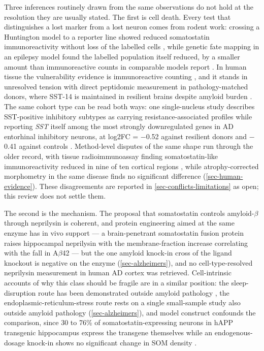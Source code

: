 \documentclass[11pt]{article}
\begin{document}
Three inferences routinely drawn from the same observations do not hold at the resolution they are usually stated. The first is cell death. Every test that distinguishes a lost marker from a lost neuron comes from rodent work: crossing a Huntington model to a reporter line showed reduced somatostatin immunoreactivity without loss of the labelled cells \citep{Voelkl2022}, while genetic fate mapping in an epilepsy model found the labelled population itself reduced, by a smaller amount than immunoreactive counts in comparable models report \citep{Drake2024}. In human tissue the vulnerability evidence is immunoreactive counting \citep{SaizSanchez2014,SanchezMejias2019}, and it stands in unresolved tension with direct peptidomic measurement in pathology-matched donors, where SST-14 is maintained in resilient brains despite amyloid burden \citep{Morgan2024a}. The same cohort type can be read both ways: one single-nucleus study describes SST-positive inhibitory subtypes as carrying resistance-associated profiles while reporting \emph{SST} itself among the most strongly downregulated genes in AD entorhinal inhibitory neurons, at log2FC = $-$0.52 against resilient donors and $-$0.41 against controls \citep{Castanho2025b}. Method-level disputes of the same shape run through the older record, with tissue radioimmunoassay finding somatostatin-like immunoreactivity reduced in nine of ten cortical regions \citep{Gabriel1993}, while atrophy-corrected morphometry in the same disease finds no significant difference (\ref{sec-human-evidence}). These disagreements are reported in \ref{sec-conflicts-limitations} as open; this review does not settle them.

The second is the mechanism. The proposal that somatostatin controls amyloid-$\beta$ through neprilysin \citep{Saito2005} is coherent, and protein engineering aimed at the same enzyme has in vivo support --- a brain-penetrant somatostatin fusion protein raises hippocampal neprilysin with the membrane-fraction increase correlating with the fall in A$\beta$42 \citep{Rofo2021} --- but the one amyloid knock-in cross of the ligand knockout is negative on the enzyme (\ref{sec-alzheimers}), and no cell-type-resolved neprilysin measurement in human AD cortex was retrieved. Cell-intrinsic accounts of why this class should be fragile are in a similar position: the sleep-disruption route has been demonstrated outside amyloid pathology \citep{Raven2025}, the endoplasmic-reticulum-stress route rests on a single small-sample study also outside amyloid pathology (\ref{sec-alzheimers}), and model construct confounds the comparison, since 30 to 76\% of somatostatin-expressing neurons in hAPP transgenic hippocampus express the transgene themselves \citep{Hofling2019} while an endogenous-dosage knock-in shows no significant change in SOM density \citep{Sos2020}.
\end{document}
